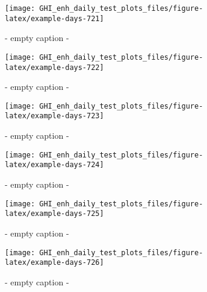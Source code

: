 \documentclass[
  10pt,
  a4paper,oneside]{article}
\begin{document}
\begin{figure}[H]

{\centering \texttt{[image: GHI\_enh\_daily\_test\_plots\_files/figure-latex/example-days-721]} 

}

\caption{ - empty caption - }\label{fig:example-days-721}
\end{figure}

\begin{figure}[H]

{\centering \texttt{[image: GHI\_enh\_daily\_test\_plots\_files/figure-latex/example-days-722]} 

}

\caption{ - empty caption - }\label{fig:example-days-722}
\end{figure}

\begin{figure}[H]

{\centering \texttt{[image: GHI\_enh\_daily\_test\_plots\_files/figure-latex/example-days-723]} 

}

\caption{ - empty caption - }\label{fig:example-days-723}
\end{figure}

\begin{figure}[H]

{\centering \texttt{[image: GHI\_enh\_daily\_test\_plots\_files/figure-latex/example-days-724]} 

}

\caption{ - empty caption - }\label{fig:example-days-724}
\end{figure}

\begin{figure}[H]

{\centering \texttt{[image: GHI\_enh\_daily\_test\_plots\_files/figure-latex/example-days-725]} 

}

\caption{ - empty caption - }\label{fig:example-days-725}
\end{figure}

\begin{figure}[H]

{\centering \texttt{[image: GHI\_enh\_daily\_test\_plots\_files/figure-latex/example-days-726]} 

}

\caption{ - empty caption - }\label{fig:example-days-726}
\end{figure}
\end{document}
